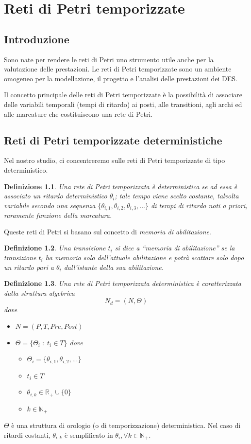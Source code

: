\documentclass[a4paper]{report}
\newtheorem{definizione}{Definizione}
\begin{document}
\chapter{Reti di Petri temporizzate}
\section{Introduzione}
Sono nate per rendere le reti di Petri uno strumento utile anche per
la valutazione delle prestazioni. Le reti di Petri temporizzate sono
un ambiente omogeneo per la modellazione, il progetto e l'analisi
delle prestazioni dei DES.

Il concetto principale delle reti di Petri temporizzate \`e la
possibilit\`a di associare delle variabili temporali (tempi di
ritardo) ai posti, alle transitioni, agli archi ed alle marcature che
costituiscono una rete di Petri.

\section{Reti di Petri temporizzate deterministiche}
Nel nostro studio, ci concentreremo sulle reti di Petri temporizzate
di tipo deterministico.
\begin{definizione}\label{def:reteDiPetriTemporizzataDeterministica}
Una rete di Petri temporizzata \`e deterministica se ad essa \`e
associato un ritardo deterministico $\theta_i$; tale tempo viene
scelto {\em costante}, talvolta {\em variabile} secondo una sequenza
$\{ \theta_{i,1},\theta_{i,2},\theta_{i,3}, ... \}$ di tempi di ritardo noti
a priori, raramente funzione della marcatura.
\end{definizione}
Queste reti di Petri si basano sul concetto di {\em memoria di
  abilitazione}.
\begin{definizione}
Una transizione $t_i$ si dice a ``memoria di abilitazione'' se la
transizione $t_i$ ha memoria solo dell'attuale abilitazione e potr\`a
scattare solo dopo un ritardo pari a $\theta_i$ dall'istante della sua
abilitazione.
\end{definizione}
\begin{definizione}
  Una rete di Petri temporizzata deterministica \`e caratterizzata
  dalla struttura algebrica
  \[
  N_d = (N, \Theta)
  \]
  dove
  \begin{itemize}
  \item $N = (P,T,Pre,Post)$
  \item $\Theta = \{ \Theta_i\; : \; t_i \in T\}$
    dove
    \begin{itemize} 
    \item[*] $\Theta_i = \{\theta_{i,1},\theta_{i,2},... \}$
    \item[*] $t_i \in T$
    \item[*] $\theta_{i,k} \in \mathbb{R_+} \cup \{0\}$
    \item[*] $k \in \mathbb{N_+}$
    \end{itemize}
  \end{itemize}
\end{definizione}
$\Theta$ \`e una struttura di orologio (o di temporizzazione)
deterministica. Nel caso di ritardi costanti, $\theta_{i,k}$ \`e
semplificato in $\theta_i, \forall k \in \mathbb{N_+}$.
\end{document}
